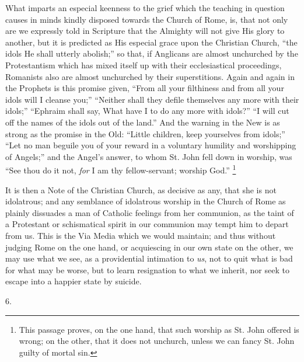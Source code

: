 What imparts an especial keenness to the grief which the teaching
in question causes in minds kindly disposed towards the Church of
Rome, is, that not only are we expressly told in Scripture that the
Almighty will not give His glory to another, but it is predicted as
His especial grace upon the Christian Church, ``the idols He shall utterly abolish;'' so that, if Anglicans are almost
unchurched by the Protestantism which has mixed itself up with their
ecclesiastical proceedings, Romanists also are almost unchurched by
their superstitions. Again and again in the Prophets is this promise
given, ``From all your filthiness and from all your idols will I
cleanse you;'' ``Neither shall they defile themselves any more
with their idols;'' ``Ephraim shall say, What have I to do any
more with idols?'' ``I will cut off the names of the idols out
of the land.'' And the warning in the New is as strong as the
promise in the Old: ``Little children, keep yourselves from
idols;'' ``Let no man beguile you of your reward in a
voluntary humility and worshipping of Angels;'' and the Angel's
answer, to whom St. John fell down in worship, was ``See thou do
it not, \emph{for} I am thy fellow-servant; worship God.'' \footnote{This passage
proves, on the one hand, that such worship as St. John offered is
wrong; on the other, that it does not unchurch, unless we can fancy
St. John guilty of mortal sin.}

It is then a Note of the Christian Church, as decisive as any, that
she is not idolatrous; and any semblance of idolatrous worship in the
Church of Rome as plainly dissuades a man of Catholic feelings from
her communion, as the taint of a Protestant or schismatical spirit in
our communion may tempt him to depart from us. This is the Via Media
which we would maintain; and thus without judging Rome on the one
hand, or acquiescing in our own state on the other, we may use what we
see, as a providential intimation to \emph{us}, not to quit what is bad for
what may be worse, but to learn resignation to what we inherit, nor
seek to escape into a happier state by suicide.

6.

